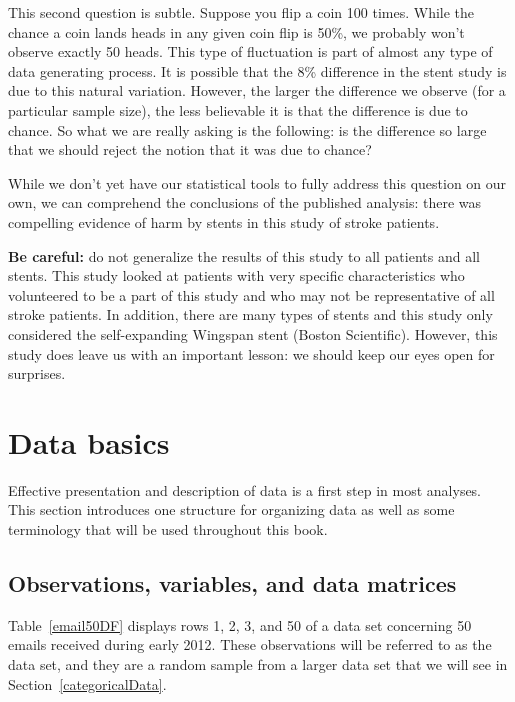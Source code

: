This second question is subtle. Suppose you flip a coin 100 times. While the chance a coin lands heads in any given coin flip is 50\%, we probably won't observe exactly 50 heads. This type of fluctuation is part of almost any type of data generating process. It is possible that the 8\% difference in the stent study is due to this natural variation. However, the larger the difference we observe (for a particular sample size), the less believable it is that the difference is due to chance. So what we are really asking is the following: is the difference so large that we should reject the notion that it was due to chance?

While we don't yet have our statistical tools to fully address this question on our own, we can comprehend the conclusions of the published analysis: there was compelling evidence of harm by stents in this study of stroke patients.

\textbf{Be careful:} do not generalize the results of this study to all patients and all stents. This study looked at patients with very specific characteristics who volunteered to be a part of this study and who may not be representative of all stroke patients. In addition, there are many types of stents and this study only considered the self-expanding Wingspan stent (Boston Scientific). However, this study does leave us with an important lesson: we should keep our eyes open for surprises.


\section{Data basics}
\label{dataBasics}

Effective presentation and description of data is a first step in most analyses. This section introduces one structure for organizing data as well as some terminology that will be used throughout this book.

\subsection{Observations, variables, and data matrices}


Table~\ref{email50DF} displays rows 1, 2, 3, and 50 of a data set concerning 50 emails received during early 2012. These observations will be referred to as the  data set, and they are a random sample from a larger data set that we will see in Section~\ref{categoricalData}.

